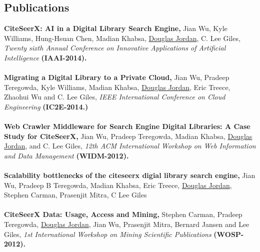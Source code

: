 \documentclass[margin]{res}
\begin{document}
\begin{resume}
\section{Publications}
{\bf CiteSeerX: AI in a Digital Library Search Engine,} Jian Wu, Kyle Williams, Hung-Hsuan Chen, Madian Khabsa, \underline{Douglas Jordan}, C. Lee Giles, \textit{Twenty sixth Annual Conference on Innovative Applications of Artificial Intelligence} {\bf (IAAI-2014).} \\ \\
{\bf Migrating a Digital Library to a Private Cloud,} Jian Wu, Pradeep Teregowda, Kyle Williams, Madian Khabsa, \underline{Douglas Jordan}, Eric Treece, Zhaohui Wu and C. Lee Giles, \emph{IEEE International Conference on Cloud Engineering} {\bf (IC2E-2014.)} \\ \\
{\bf Web Crawler Middleware for Search Engine Digital Libraries: A Case Study for CiteSeerX,} Jian Wu, Pradeep Teregowda, Madian Khabsa, \underline{Douglas Jordan}, and C. Lee Giles, \emph{12th ACM International Workshop on Web Information and Data Management} {\bf (WIDM-2012).}  \\ \\
{\bf Scalability bottlenecks of the citeseerx digial library search engine,} Jian Wu, Pradeep B Teregowda, Madian Khabsa, Eric Treece, \underline{Douglas Jordan}, Stephen Carman, Prasenjit Mitra, C Lee Giles \\ \\
{\bf CiteSeerX Data: Usage, Access and Mining,} Stephen Carman, Pradeep Teregowda, \underline{Douglas Jordan}, Jian Wu, Prasenjit Mitra, Bernard Jansen and Lee Giles, \emph{1st International Workshop on Mining Scientific Publications} {\bf (WOSP-2012).}


\end{resume}
\end{document}
